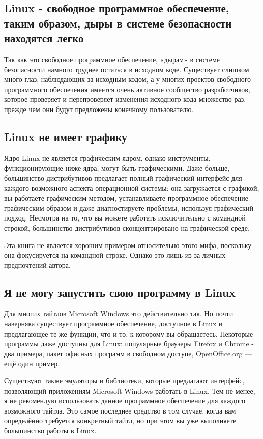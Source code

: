 \documentclass[12pt]{book}
\begin{document}
\subsection{Linux - свободное программное обеспечение, таким образом, дыры в системе безопасности находятся легко}

Так как это свободное программное обеспечение, «дырам» в системе безопасности намного труднее остаться в исходном коде. Существует слишком много глаз, наблюдающих за исходным кодом, а у многих проектов свободного программного обеспечения имеется очень активное сообщество разработчиков, которое проверяет и перепроверяет изменения исходного кода множество раз, прежде чем они будут предложены конечному пользователю.

\subsection{Linux не имеет графику}

Ядро Linux не является графическим ядром, однако инструменты, функционирующие ниже ядра, могут быть графическими. Даже больше, большинство дистрибутивов предлагает полный графический интерфейс для каждого возможного аспекта операционной системы: она загружается с графикой, вы работаете графическим методом, устанавливаете программное обеспечение графическим образом и даже диагностируете проблемы, используя графический подход. Несмотря на то, что вы можете работать исключительно с командной строкой, большинство дистрибутивов сконцентрировано на графической среде.

Эта книга не является хорошим примером относительно этого мифа, поскольку она фокусируется на командной строке. Однако это лишь из-за личных предпочтений автора.

\subsection{Я не могу запустить свою программу в Linux}

Для многих тайтлов Microsoft Windows это действительно так. Но почти наверняка существует программное обеспечение, доступное в Linux и предлагающее те же функции, что и то, к которому вы обращаетесь. Некоторые программы даже доступны для Linux: популярные браузеры Firefox и Chrome - два примера, пакет офисных программ в свободном доступе, OpenOffice.org — ещё один пример.

Существуют также эмуляторы и библиотеки, которые предлагают интерфейс, позволяющий приложениям Microsoft Windows работать в Linux. Тем не менее, я не рекомендую использовать данное программное обеспечение для каждого возможного тайтла. Это самое последнее средство в том случае, когда вам определённо требуется конкретный тайтл, но при этом вы уже выполняете большинство работы в Linux.
\end{document}
